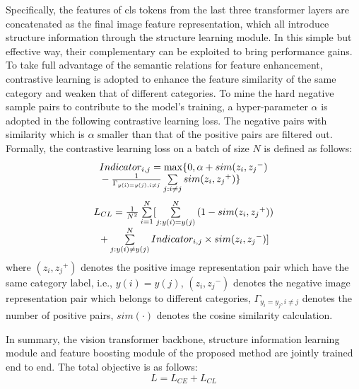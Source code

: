 \documentclass[sigconf, nonacm]{acmart}
\begin{document}
Specifically, the features of cls tokens from the last three transformer layers are concatenated as the final image feature representation, which all introduce structure information through the structure learning module. In this simple but effective way, their complementary can be exploited to bring performance gains. To take full advantage of the semantic relations for feature enhancement, contrastive learning is adopted to enhance the feature similarity of the same category and weaken that of different categories. To mine the hard negative sample pairs to contribute to the model’s training, a hyper-parameter $\alpha $ is adopted in the following contrastive learning loss. The negative pairs with similarity which is $\alpha $ smaller than that of the positive pairs are filtered out. Formally, the contrastive learning loss on a batch of size $N$ is defined as follows:
\begin{equation}
\label{alpha}
\begin{array}{l}
Indicato{r_{i,j}} = \max \{ 0,\alpha  + sim({z_i},{z_j}^ - )\\
{\rm{                      }} - \frac{1}{{{\Gamma _{y(i) = y(j),i \ne j}}}}\sum\limits_{j:i \ne j} {sim({z_i},{z_j}^ + )} \} 
\end{array}
\end{equation}
\begin{equation}
\begin{array}{c}
{L_{CL}} = \frac{1}{{{N^2}}}\sum\limits_{i = 1}^N [ \sum\limits_{j:y(i) = y(j)}^N {(1 - sim({z_i},{z_j}^ + )} )\\
{\rm{         }} + \sum\limits_{j:y(i) \ne y(j)}^N {Indicato{r_{i,j}} \times sim({z_i},{z_j}^ - )} ]
\end{array}
\end{equation}
where ${({z_i},{z_j}^ + )}$ denotes the positive image representation pair which have the same category label, i.e., $y(i) = y(j)$, ${({z_i},{z_j}^ - )}$ denotes the negative image representation pair which belongs to different categories, ${{\Gamma _{{y_i} = {y_j},i \ne j}}}$ denotes the number of positive pairs, $sim( \cdot )$ denotes the cosine similarity calculation.

In summary, the vision transformer backbone, structure information learning module and feature boosting module of the proposed method are jointly trained end to end. The total objective is as follows:
\begin{equation}
L = {L_{CE}} + {L_{CL}}
\end{equation}
\end{document}
